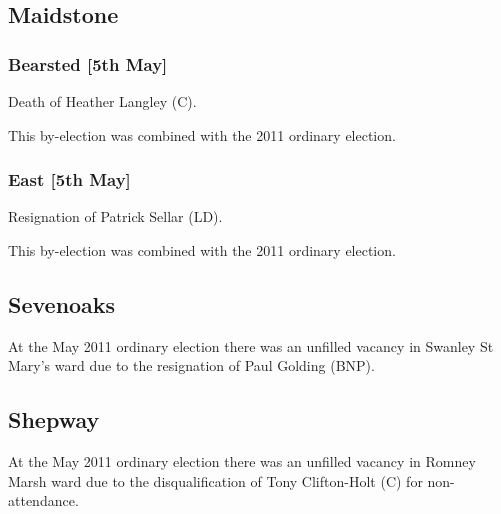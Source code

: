 \begin{resultsiii}
\subsection*{Maidstone}

\subsubsection*{Bearsted \hspace*{\fill}\nolinebreak[1]%
\enspace\hspace*{\fill}
[5th May]}


Death of Heather Langley (C).

This by-election was combined with the 2011 ordinary election.

\subsubsection*{East \hspace*{\fill}\nolinebreak[1]%
\enspace\hspace*{\fill}
[5th May]}


Resignation of Patrick Sellar (LD).

This by-election was combined with the 2011 ordinary election.

\subsection*{Sevenoaks}


At the May 2011 ordinary election there was an unfilled vacancy in Swanley St Mary's ward due to the resignation of Paul Golding (BNP).

\subsection*{Shepway}


At the May 2011 ordinary election there was an unfilled vacancy in Romney Marsh ward due to the disqualification of Tony Clifton-Holt (C) for non-attendance.


\end{resultsiii}
